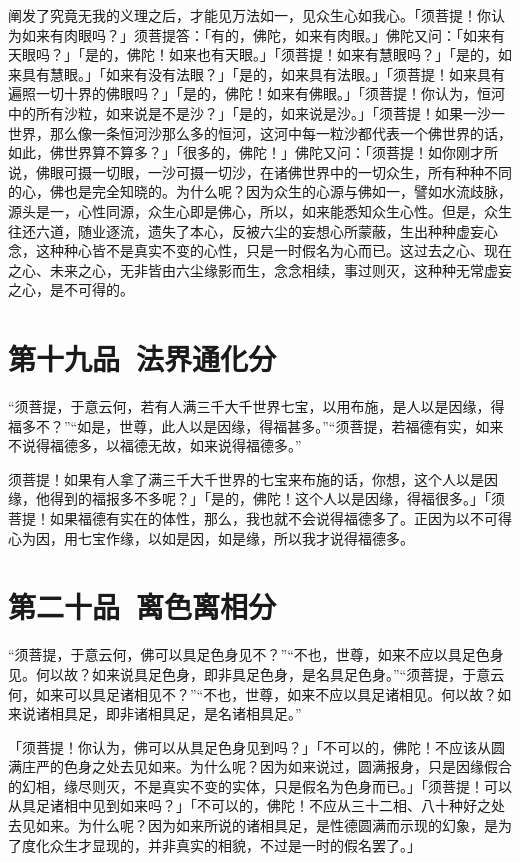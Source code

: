 \documentclass[12pt,twoside,openany]{book}
\newcommand{\kai}[1]{{\CJKfamily{kai}#1}}
\begin{document}
\kai{阐发了究竟无我的义理之后，才能见万法如一，见众生心如我心。「须菩提！你认为如来有肉眼吗？」须菩提答：「有的，佛陀，如来有肉眼。」佛陀又问：「如来有天眼吗？」「是的，佛陀！如来也有天眼。」「须菩提！如来有慧眼吗？」「是的，如来具有慧眼。」「如来有没有法眼？」「是的，如来具有法眼。」「须菩提！如来具有遍照一切十界的佛眼吗？」「是的，佛陀！如来有佛眼。」「须菩提！你认为，恒河中的所有沙粒，如来说是不是沙？」「是的，如来说是沙。」「须菩提！如果一沙一世界，那么像一条恒河沙那么多的恒河，这河中每一粒沙都代表一个佛世界的话，如此，佛世界算不算多？」「很多的，佛陀！」佛陀又问：「须菩提！如你刚才所说，佛眼可摄一切眼，一沙可摄一切沙，在诸佛世界中的一切众生，所有种种不同的心，佛也是完全知晓的。为什么呢？因为众生的心源与佛如一，譬如水流歧脉，源头是一，心性同源，众生心即是佛心，所以，如来能悉知众生心性。但是，众生往还六道，随业逐流，遗失了本心，反被六尘的妄想心所蒙蔽，生出种种虚妄心念，这种种心皆不是真实不变的心性，只是一时假名为心而已。这过去之心、现在之心、未来之心，无非皆由六尘缘影而生，念念相续，事过则灭，这种种无常虚妄之心，是不可得的。}

\chapter{第十九品\ 法界通化分}
“须菩提，于意云何，若有人满三千大千世界七宝，以用布施，是人以是因缘，得福多不？”“如是，世尊，此人以是因缘，得福甚多。”“须菩提，若福德有实，如来不说得福德多，以福德无故，如来说得福德多。”

\kai{须菩提！如果有人拿了满三千大千世界的七宝来布施的话，你想，这个人以是因缘，他得到的福报多不多呢？」「是的，佛陀！这个人以是因缘，得福很多。」「须菩提！如果福德有实在的体性，那么，我也就不会说得福德多了。正因为以不可得心为因，用七宝作缘，以如是因，如是缘，所以我才说得福德多。}

\chapter{第二十品\ 离色离相分}
“须菩提，于意云何，佛可以具足色身见不？”“不也，世尊，如来不应以具足色身见。何以故？如来说具足色身，即非具足色身，是名具足色身。”“须菩提，于意云何，如来可以具足诸相见不？”“不也，世尊，如来不应以具足诸相见。何以故？如来说诸相具足，即非诸相具足，是名诸相具足。”

\kai{「须菩提！你认为，佛可以从具足色身见到吗？」「不可以的，佛陀！不应该从圆满庄严的色身之处去见如来。为什么呢？因为如来说过，圆满报身，只是因缘假合的幻相，缘尽则灭，不是真实不变的实体，只是假名为色身而已。」「须菩提！可以从具足诸相中见到如来吗？」「不可以的，佛陀！不应从三十二相、八十种好之处去见如来。为什么呢？因为如来所说的诸相具足，是性德圆满而示现的幻象，是为了度化众生才显现的，并非真实的相貌，不过是一时的假名罢了。」}
\end{document}
